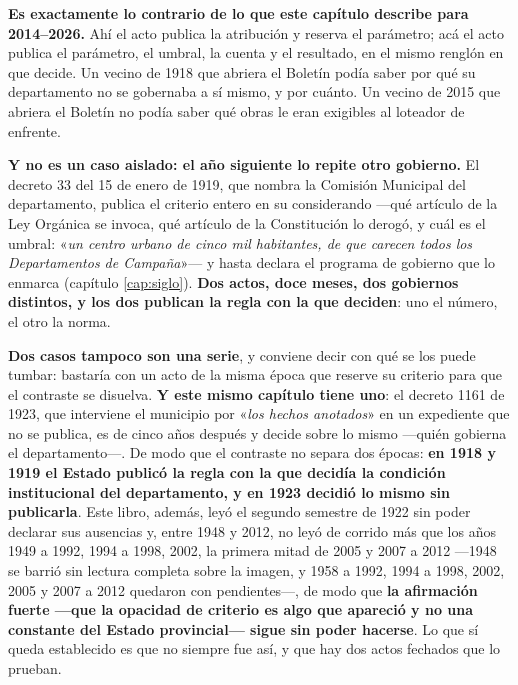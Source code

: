 \begin{cautela}
\textbf{Es exactamente lo contrario de lo que este capítulo describe para 2014--2026.} Ahí el
acto publica la atribución y reserva el parámetro; acá el acto publica el parámetro, el umbral,
la cuenta y el resultado, en el mismo renglón en que decide. Un vecino de 1918 que abriera el
Boletín podía saber por qué su departamento no se gobernaba a sí mismo, y por cuánto. Un vecino
de 2015 que abriera el Boletín no podía saber qué obras le eran exigibles al loteador de
enfrente.

\textbf{Y no es un caso aislado: el año siguiente lo repite otro gobierno.} El decreto 33 del 15
de enero de 1919, que nombra la Comisión Municipal del departamento, publica el criterio entero
en su considerando ---qué artículo de la Ley Orgánica se invoca, qué artículo de la Constitución
lo derogó, y cuál es el umbral: «\textit{un centro urbano de cinco mil habitantes, de que carecen
todos los Departamentos de Campaña}»--- y hasta declara el programa de gobierno que lo
enmarca (capítulo \ref{cap:siglo}). \textbf{Dos actos, doce meses, dos gobiernos distintos, y
los dos publican la regla con la que deciden}: uno el número, el otro la norma.

\textbf{Dos casos tampoco son una serie}, y conviene decir con qué se los puede tumbar: bastaría
con un acto de la misma época que reserve su criterio para que el contraste se disuelva. \textbf{Y
este mismo capítulo tiene uno}: el decreto 1161 de 1923, que interviene el municipio por «\textit{los
hechos anotados}» en un expediente que no se publica, es de cinco años después y decide sobre lo
mismo ---quién gobierna el departamento---. De modo que el contraste no separa dos épocas: \textbf{en
1918 y 1919 el Estado publicó la regla con la que decidía la condición institucional del
departamento, y en 1923 decidió lo mismo sin publicarla}. Este libro, además, leyó el segundo
semestre de 1922 sin poder declarar sus ausencias y, entre 1948 y 2012, no leyó de corrido más que los años 1949 a 1992, 1994 a 1998, 2002, la primera mitad de 2005 y 2007 a 2012 ---1948 se
barrió sin lectura completa sobre la imagen, y 1958 a 1992, 1994 a 1998, 2002, 2005 y 2007 a 2012 quedaron con pendientes---, de modo que \textbf{la afirmación fuerte ---que la opacidad de criterio es algo que
apareció y no una constante del Estado provincial--- sigue sin poder hacerse}. Lo que sí queda
establecido es que no siempre fue así, y que hay dos actos fechados que lo prueban.
\end{cautela}

